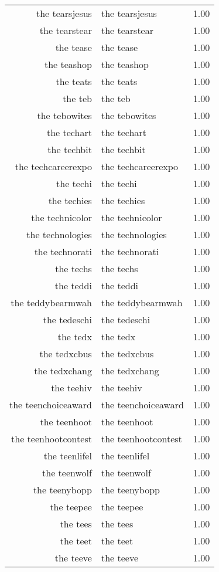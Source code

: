 \begin{table}[ht]
\begin{tabular}{rlr}
  the tearsjesus & the tearsjesus & 1.00 \\ 
  the tearstear & the tearstear & 1.00 \\ 
  the tease & the tease & 1.00 \\ 
  the teashop & the teashop & 1.00 \\ 
  the teats & the teats & 1.00 \\ 
  the teb & the teb & 1.00 \\ 
  the tebowites & the tebowites & 1.00 \\ 
  the techart & the techart & 1.00 \\ 
  the techbit & the techbit & 1.00 \\ 
  the techcareerexpo & the techcareerexpo & 1.00 \\ 
  the techi & the techi & 1.00 \\ 
  the techies & the techies & 1.00 \\ 
  the technicolor & the technicolor & 1.00 \\ 
  the technologies & the technologies & 1.00 \\ 
  the technorati & the technorati & 1.00 \\ 
  the techs & the techs & 1.00 \\ 
  the teddi & the teddi & 1.00 \\ 
  the teddybearmwah & the teddybearmwah & 1.00 \\ 
  the tedeschi & the tedeschi & 1.00 \\ 
  the tedx & the tedx & 1.00 \\ 
  the tedxcbus & the tedxcbus & 1.00 \\ 
  the tedxchang & the tedxchang & 1.00 \\ 
  the teehiv & the teehiv & 1.00 \\ 
  the teenchoiceaward & the teenchoiceaward & 1.00 \\ 
  the teenhoot & the teenhoot & 1.00 \\ 
  the teenhootcontest & the teenhootcontest & 1.00 \\ 
  the teenlifel & the teenlifel & 1.00 \\ 
  the teenwolf & the teenwolf & 1.00 \\ 
  the teenybopp & the teenybopp & 1.00 \\ 
  the teepee & the teepee & 1.00 \\ 
  the tees & the tees & 1.00 \\ 
  the teet & the teet & 1.00 \\ 
  the teeve & the teeve & 1.00 \\ 

\end{tabular}
\end{table}

